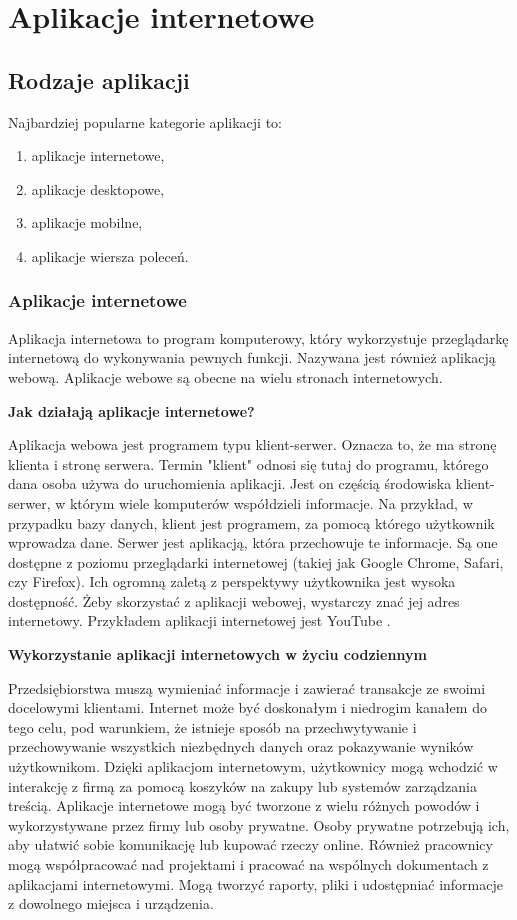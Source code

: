 \chapter{Aplikacje internetowe}

\section{Rodzaje aplikacji}
Najbardziej popularne kategorie aplikacji \cite{typy-aplikacji} to:
\begin{enumerate}
    \item aplikacje internetowe,
    \item aplikacje desktopowe,
    \item aplikacje mobilne,
    \item aplikacje wiersza poleceń.
\end{enumerate}

\subsection{Aplikacje internetowe}
Aplikacja internetowa to program komputerowy, który wykorzystuje przeglądarkę internetową do wykonywania pewnych funkcji. Nazywana jest również aplikacją webową. Aplikacje webowe są obecne na wielu stronach internetowych. 

\textbf{Jak działają aplikacje internetowe?}

Aplikacja webowa jest programem typu klient-serwer. Oznacza to, że ma stronę klienta i stronę serwera. Termin "klient" odnosi się tutaj do programu, którego dana osoba używa do uruchomienia aplikacji. Jest on częścią środowiska klient-serwer, w którym wiele komputerów współdzieli informacje. Na przykład, w przypadku bazy danych, klient jest programem, za pomocą którego użytkownik wprowadza dane. Serwer jest aplikacją, która przechowuje te informacje. Są one dostępne z poziomu przeglądarki internetowej (takiej jak Google Chrome, Safari, czy Firefox). Ich ogromną zaletą z perspektywy użytkownika jest wysoka dostępność. Żeby skorzystać z aplikacji webowej, wystarczy znać jej adres internetowy. Przykładem aplikacji internetowej jest YouTube \cite{youtube}.

\textbf{Wykorzystanie aplikacji internetowych w życiu codziennym}

Przedsiębiorstwa muszą wymieniać informacje i zawierać transakcje ze swoimi docelowymi klientami. Internet może być doskonałym i niedrogim kanałem do tego celu, pod warunkiem, że istnieje sposób na przechwytywanie i przechowywanie wszystkich niezbędnych danych oraz pokazywanie wyników użytkownikom. Dzięki aplikacjom internetowym, użytkownicy mogą wchodzić w interakcję z firmą za pomocą koszyków na zakupy lub systemów zarządzania treścią. Aplikacje internetowe mogą być tworzone z wielu różnych powodów i wykorzystywane przez firmy lub osoby prywatne. Osoby prywatne potrzebują ich, aby ułatwić sobie komunikację lub kupować rzeczy online. Również pracownicy mogą współpracować nad projektami i pracować na wspólnych dokumentach z aplikacjami internetowymi. Mogą tworzyć raporty, pliki i udostępniać informacje z dowolnego miejsca i urządzenia.

